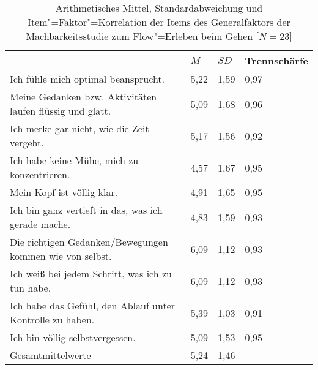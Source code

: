 \newpage
\begin{table}
	[!htb] \centering \caption[Item"=Faktor"=Korrelation der Items des Generalfaktors (Machbarkeitsstudie: Gehen)]{Arithmetisches Mittel, Standardabweichung und Item"=Faktor"=Korrelation der Items des Generalfaktors der Machbarkeitsstudie zum Flow"=Erleben beim Gehen [$N = 23$]} \label{tab:generalfaktor_2} 
	\begin{tabularx}
		{ 
		\textwidth}{p{} p{} p{} p{}} \toprule & $M$ & $SD$ & Trennschärfe \\
		\midrule Ich fühle mich optimal beansprucht. & 5,22 & 1,59 & 0,97 \\
		Meine Gedanken bzw. Aktivitäten laufen flüssig und glatt. & 5,09 & 1,68 & 0,96 \\
		Ich merke gar nicht, wie die Zeit vergeht. & 5,17 & 1,56 & 0,92 \\
		Ich habe keine Mühe, mich zu konzentrieren. & 4,57 & 1,67 & 0,95 \\
		Mein Kopf ist völlig klar. & 4,91 & 1,65 & 0,95 \\
		Ich bin ganz vertieft in das, was ich gerade mache. & 4,83 & 1,59 & 0,93 \\
		Die richtigen Gedanken/Bewegungen kommen wie von selbst. & 6,09 & 1,12 & 0,93 \\
		Ich weiß bei jedem Schritt, was ich zu tun habe. & 6,09 & 1,12 & 0,93 \\
		Ich habe das Gefühl, den Ablauf unter Kontrolle zu haben. & 5,39 & 1,03 & 0,91 \\
		Ich bin völlig selbstvergessen. & 5,09 & 1,53 & 0,95 \\
		Gesamtmittelwerte & 5,24 & 1,46 & \\
		\bottomrule 
	\end{tabularx}
\end{table}
